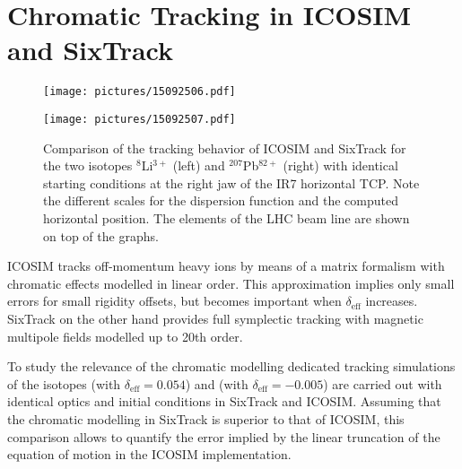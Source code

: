 \section{Chromatic Tracking in ICOSIM and SixTrack}

\begin{figure*}[b]
\begin{minipage}[t]{0.49\textwidth}
\texttt{[image: pictures/15092506.pdf]}
\end{minipage}
\begin{minipage}[t]{0.49\textwidth}
\texttt{[image: pictures/15092507.pdf]}
\end{minipage}
\caption{Comparison of the tracking behavior of ICOSIM and SixTrack for the two isotopes $^{8}$Li$^{3+}$ (left) and $^{207}$Pb$^{82+}$ (right) with identical starting conditions at the right jaw of the IR7 horizontal TCP. Note the different scales for the dispersion function and the computed horizontal position. The elements of the LHC beam line are shown on top of the graphs. }
\label{fig:15032202.pdf}
\end{figure*}

ICOSIM tracks off-momentum heavy ions by means of a matrix formalism with chromatic effects modelled in linear order. This approximation implies only small errors for small rigidity offsets, but becomes important when $\delta_\text{eff}$ increases. SixTrack on the other hand provides full symplectic tracking with magnetic multipole fields modelled up to 20th order. 

To study the relevance of the chromatic modelling dedicated tracking simulations of the isotopes  (with $\delta_\text{eff} = 0.054$) and  (with $\delta_\text{eff} = -0.005$) are carried out with identical optics and initial conditions in SixTrack and ICOSIM. Assuming that the chromatic modelling in SixTrack is superior to that of ICOSIM, this comparison allows to quantify the error implied by the linear truncation of the equation of motion in the ICOSIM implementation. 

